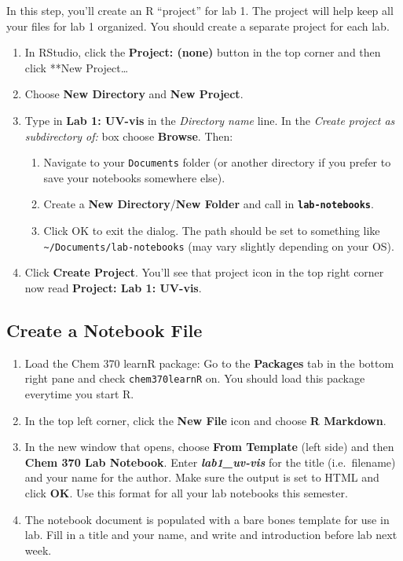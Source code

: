 \documentclass[]{tufte-book}
\providecommand{\tightlist}{%
  \setlength{\itemsep}{0pt}\setlength{\parskip}{0pt}}
\begin{document}
In this step, you'll create an R ``project'' for lab 1. The project will help keep all your files for lab 1 organized. You should create a separate project for each lab.

\begin{enumerate}
\def\labelenumi{\arabic{enumi}.}
\tightlist
\item
  In RStudio, click the \textbf{Project: (none)} button in the top corner and then click **New Project\ldots*
\item
  Choose \textbf{New Directory} and \textbf{New Project}.
\item
  Type in \textbf{Lab 1: UV-vis} in the \emph{Directory name} line. In the \emph{Create project as subdirectory of:} box choose \textbf{Browse}. Then:

  \begin{enumerate}
  \def\labelenumii{\arabic{enumii}.}
  \tightlist
  \item
    Navigate to your \texttt{Documents} folder (or another directory if you prefer to save your notebooks somewhere else).
  \item
    Create a \textbf{New Directory}/\textbf{New Folder} and call in \textbf{\texttt{lab-notebooks}}.
  \item
    Click OK to exit the dialog. The path should be set to something like \texttt{\textasciitilde{}/Documents/lab-notebooks} (may vary slightly depending on your OS).
  \end{enumerate}
\item
  Click \textbf{Create Project}. You'll see that project icon in the top right corner now read \textbf{Project: Lab 1: UV-vis}.
\end{enumerate}

\hypertarget{create-a-notebook-file}{%
\subsection*{Create a Notebook File}\label{create-a-notebook-file}}

\begin{enumerate}
\def\labelenumi{\arabic{enumi}.}
\tightlist
\item
  Load the Chem 370 learnR package: Go to the \textbf{Packages} tab in the bottom right pane and check \texttt{chem370learnR} on. You should load this package everytime you start R.
\item
  In the top left corner, click the \textbf{New File} icon and choose \textbf{R Markdown}.
\item
  In the new window that opens, choose \textbf{From Template} (left side) and then \textbf{Chem 370 Lab Notebook}. Enter \textbf{\emph{lab1\_uv-vis}} for the title (i.e.~filename) and your name for the author. Make sure the output is set to HTML and click \textbf{OK}. Use this format for all your lab notebooks this semester.
\item
  The notebook document is populated with a bare bones template for use in lab. Fill in a title and your name, and write and introduction before lab next week.
\end{enumerate}
\end{document}
